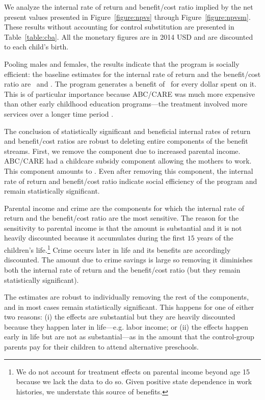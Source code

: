 We analyze the internal rate of return and benefit/cost ratio implied by the net present values presented in Figure~\ref{figure:npvs} through Figure~\ref{figure:npvsm}. These results without accounting for control substitution are presented in Table~\ref{table:cba}. All the monetary figures are in 2014 USD and are discounted to each child's birth.

Pooling males and females, the results indicate that the program is socially efficient: the baseline estimates for the internal rate of return and the benefit/cost ratio are \irrp\ and \bcp. The program generates a benefit of \bcp\ for every dollar spent on it. This is of particular importance because ABC/CARE was much more expensive than other early childhood education programs---the treatment involved more services over a longer time period \citep{Elango_Hojman_etal_2016_Early-Edu}.

The conclusion of statistically significant and beneficial internal rates of return and benefit/cost ratios are robust to deleting entire components of the benefit streams. First, we remove the component due to increased parental income. ABC/CARE had a childcare subsidy component allowing the mothers to work. This component amounts to \parincomenpvp. Even after removing this component, the internal rate of return and benefit/cost ratio indicate social efficiency of the program and remain statistically significant.

Parental income and crime are the components for which the internal rate of return and the benefit/cost ratio are the most sensitive. The reason for the sensitivity to parental income is that the amount is substantial and it is not heavily discounted because it accumulates during the first $15$ years of the children's life.\footnote{We do not account for treatment effects on parental income beyond age 15 because we lack the data to do so. Given positive state dependence in work histories, we understate this source of benefits.} Crime occurs later in life and its benefits are accordingly discounted. The amount due to crime savings is large so removing it diminishes both the internal rate of return and the benefit/cost ratio (but they remain statistically significant).

The estimates are robust to individually removing the rest of the components, and in most cases remain statistically significant. This happens for one of either two reasons: (i) the effects are substantial but they are heavily discounted because they happen later in life---e.g. labor income; or (ii) the effects happen early in life but are not as substantial---as in the amount that the control-group parents pay for their children to attend alternative preschools.

